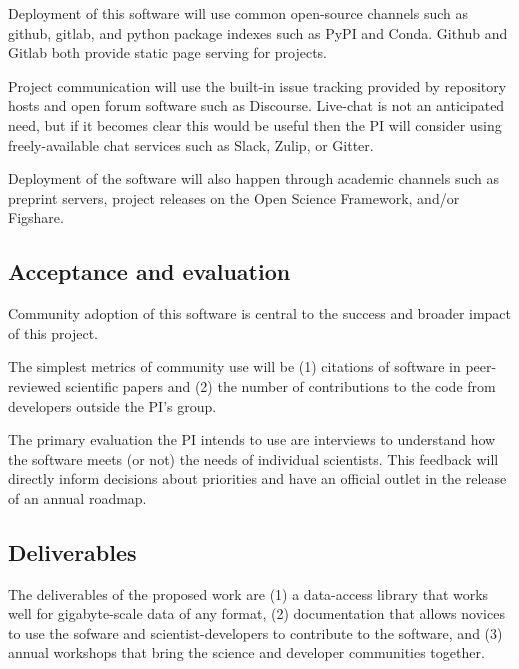 Deployment of this software will use common open-source channels such as github, gitlab, and python package indexes such as PyPI and Conda.  Github and Gitlab both provide static page serving for projects.

Project communication will use the built-in issue tracking provided by repository hosts and open forum software such as Discourse.  Live-chat is not an anticipated need, but if it becomes clear this would be useful then the PI will consider using freely-available chat services such as Slack, Zulip, or Gitter.

Deployment of the software will also happen through academic channels such as preprint servers, project releases on the Open Science Framework, and/or Figshare.



\subsection{Acceptance and evaluation}

Community adoption of this software is central to the success and broader impact of this project.

The simplest metrics of community use will be (1) citations of software in peer-reviewed scientific papers and (2) the number of contributions to the code from developers outside the PI's group.

The primary evaluation the PI intends to use are interviews to understand how the software meets (or not) the needs of individual scientists.  This feedback will directly inform decisions about priorities and have an official outlet in the release of an annual roadmap.  


\subsection{Deliverables}
The deliverables of the proposed work are (1) a data-access library that works well for gigabyte-scale data of any format, (2) documentation that allows novices to use the sofware and scientist-developers to contribute to the software, and (3) annual workshops that bring the science and developer communities together.

